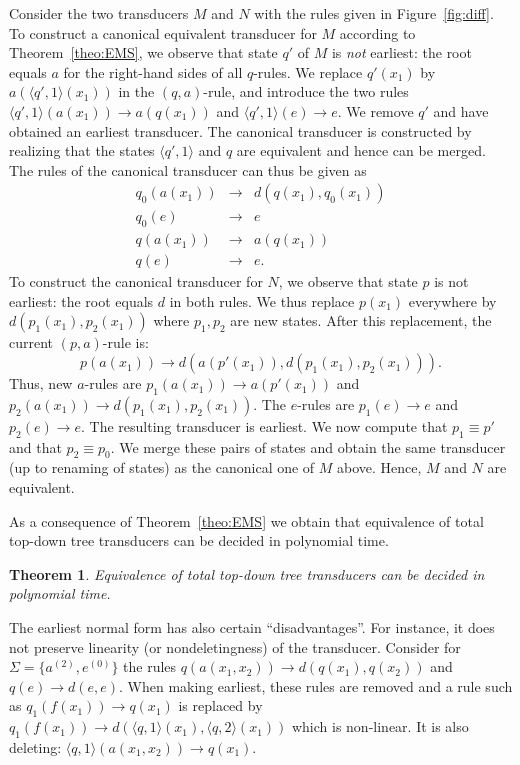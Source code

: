 \documentclass[copyright,creativecommons]{eptcs}
\newtheorem{theorem}{Theorem}
\begin{document}
Consider the two transducers $M$ and $N$ with the rules given
in Figure~\ref{fig:diff}. To construct a canonical equivalent transducer
for $M$ according to Theorem~\ref{theo:EMS}, we observe that state
$q'$ of $M$ is \emph{not} earliest: the root equals $a$ for 
the right-hand sides of all $q$-rules. We replace 
$q'(x_1)$ by $a(\langle q',1\rangle(x_1))$ in the $(q,a)$-rule, and
introduce the two rules $\langle q',1\rangle(a(x_1))\to a(q(x_1))$ and
$\langle q',1\rangle(e)\to e$. We remove $q'$ and have obtained 
an earliest transducer. The canonical transducer is constructed
by realizing that the states $\langle q',1\rangle$ and $q$ are equivalent
and hence can be merged. The rules of the canonical transducer can
thus be given as
\[
\begin{array}{lcl}
q_0(a(x_1))&\to&d(q(x_1),q_0(x_1))\\
q_0(e)&\to&e\\
q(a(x_1))&\to&a(q(x_1))\\
q(e)&\to& e.
\end{array}
\]
To construct the canonical transducer for $N$, we observe that state $p$
is not earliest: the root equals $d$ in both rules. 
We thus replace $p(x_1)$ everywhere by $d(p_1(x_1),p_2(x_1))$ where
$p_1,p_2$ are new states. After this replacement, the 
current $(p,a)$-rule is:
\[
p(a(x_1))\to d(a(p'(x_1)),d(p_1(x_1),p_2(x_1))).
\]
Thus, new $a$-rules are
$p_1(a(x_1))\to a(p'(x_1))$ and
$p_2(a(x_1))\to d(p_1(x_1),p_2(x_1))$.
The $e$-rules are $p_1(e)\to e$ and $p_2(e)\to e$.
The resulting transducer is earliest.
We now compute that $p_1\equiv p'$ and that $p_2\equiv p_0$.
We merge these pairs of states and obtain the same transducer
(up to renaming of states) as the canonical one of $M$ above.
Hence, $M$ and $N$ are equivalent.

As a consequence of Theorem~\ref{theo:EMS}
we obtain that equivalence of total top-down
tree transducers can be decided in polynomial time. 

\begin{theorem}\rm\label{theo:complex}
Equivalence of total top-down tree transducers can be
decided in polynomial time.
\end{theorem}

The earliest normal form has also certain ``disadvantages''.
For instance, it does not preserve linearity (or nondeletingness) of the
transducer. Consider for $\Sigma=\{a^{(2)},e^{(0)}\}$ the rules
$q(a(x_1,x_2))\to d(q(x_1),q(x_2))$
and $q(e)\to d(e,e)$.
When making earliest, these rules are removed and a rule such as 
$q_1(f(x_1))\to q(x_1)$ is replaced by
$q_1(f(x_1))\to d(\langle q,1\rangle(x_1),\langle q,2\rangle(x_1))$
which is non-linear. It is also deleting:
$\langle q,1\rangle(a(x_1,x_2))\to q(x_1)$.
\end{document}
